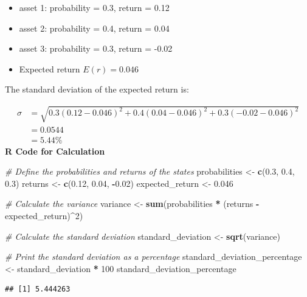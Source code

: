 \documentclass[
]{book}
\newenvironment{Shaded}{\begin{snugshade}}{\end{snugshade}}
\newcommand{\CommentTok}[1]{\textcolor[rgb]{0.56,0.35,0.01}{\textit{#1}}}
\newcommand{\DecValTok}[1]{\textcolor[rgb]{0.00,0.00,0.81}{#1}}
\newcommand{\FloatTok}[1]{\textcolor[rgb]{0.00,0.00,0.81}{#1}}
\newcommand{\FunctionTok}[1]{\textcolor[rgb]{0.13,0.29,0.53}{\textbf{#1}}}
\newcommand{\NormalTok}[1]{#1}
\newcommand{\OtherTok}[1]{\textcolor[rgb]{0.56,0.35,0.01}{#1}}
\newcommand{\SpecialCharTok}[1]{\textcolor[rgb]{0.81,0.36,0.00}{\textbf{#1}}}
\providecommand{\tightlist}{%
  \setlength{\itemsep}{0pt}\setlength{\parskip}{0pt}}
\begin{document}
\begin{itemize}
\tightlist
\item
  asset 1: probability = 0.3, return = 0.12
\item
  asset 2: probability = 0.4, return = 0.04
\item
  asset 3: probability = 0.3, return = -0.02
\item
  Expected return \(E(r) = 0.046\)
\end{itemize}

The standard deviation of the expected return is:

\[
\begin{aligned}
\sigma &= \sqrt{0.3(0.12 - 0.046)^2 + 0.4(0.04 - 0.046)^2 + 0.3(-0.02 - 0.046)^2}\\
       &= 0.0544\\
       &= 5.44\%
\end{aligned}
\] \textbf{R Code for Calculation}

\begin{Shaded}
\begin{Highlighting}[]
\CommentTok{\# Define the probabilities and returns of the states}
\NormalTok{probabilities }\OtherTok{\textless{}{-}} \FunctionTok{c}\NormalTok{(}\FloatTok{0.3}\NormalTok{, }\FloatTok{0.4}\NormalTok{, }\FloatTok{0.3}\NormalTok{)}
\NormalTok{returns }\OtherTok{\textless{}{-}} \FunctionTok{c}\NormalTok{(}\FloatTok{0.12}\NormalTok{, }\FloatTok{0.04}\NormalTok{, }\SpecialCharTok{{-}}\FloatTok{0.02}\NormalTok{)}
\NormalTok{expected\_return }\OtherTok{\textless{}{-}} \FloatTok{0.046}

\CommentTok{\# Calculate the variance}
\NormalTok{variance }\OtherTok{\textless{}{-}} \FunctionTok{sum}\NormalTok{(probabilities }\SpecialCharTok{*}\NormalTok{ (returns }\SpecialCharTok{{-}}\NormalTok{ expected\_return)}\SpecialCharTok{\^{}}\DecValTok{2}\NormalTok{)}

\CommentTok{\# Calculate the standard deviation}
\NormalTok{standard\_deviation }\OtherTok{\textless{}{-}} \FunctionTok{sqrt}\NormalTok{(variance)}

\CommentTok{\# Print the standard deviation as a percentage}
\NormalTok{standard\_deviation\_percentage }\OtherTok{\textless{}{-}}\NormalTok{ standard\_deviation }\SpecialCharTok{*} \DecValTok{100}
\NormalTok{standard\_deviation\_percentage}
\end{Highlighting}
\end{Shaded}

\begin{verbatim}
## [1] 5.444263
\end{verbatim}
\end{document}
